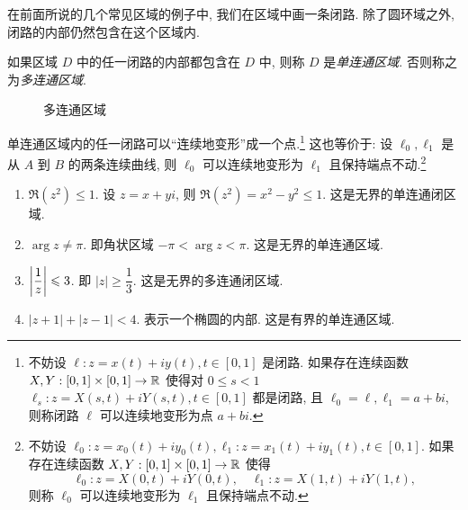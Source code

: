 在前面所说的几个常见区域的例子中, 我们在区域中画一条闭路.
除了圆环域之外, 闭路的内部仍然包含在这个区域内.

\begin{definition}[单连通区域和多连通区域]
  如果区域 $D$ 中的任一闭路的内部都包含在 $D$ 中, 则称 $D$ 是\emph{单连通区域}.
  否则称之为\emph{多连通区域}.
\end{definition}

\begin{figure}[hbpt]
  \centering
  \caption{多连通区域}
\end{figure}

单连通区域内的任一闭路可以``连续地变形''成一个点.\footnote{不妨设 $\ell: z=x(t)+iy(t),t\in[0,1]$ 是闭路.
如果存在连续函数 $X,Y:[0,1]\times[0,1]\to {\mathbb{R}}$ 使得对 $0\le s<1$
$\ell_s: z=X(s,t)+iY(s,t),t\in[0,1]$
都是闭路, 且 $\ell_0=\ell,\ell_1=a+bi$,
则称闭路 $\ell$ 可以连续地变形为点 $a+bi$.}
这也等价于: 设 $\ell_0,\ell_1$ 是从 $A$ 到 $B$ 的两条连续曲线, 则 $\ell_0$ 可以连续地变形为 $\ell_1$ 且保持端点不动.\footnote{不妨设 $\ell_0: z=x_0(t)+iy_0(t),\ell_1: z=x_1(t)+iy_1(t),t\in[0,1]$.
如果存在连续函数 $X,Y:[0,1]\times[0,1]\to {\mathbb{R}}$ 使得
\[\ell_0: z=X(0,t)+iY(0,t),\quad \ell_1: z=X(1,t)+iY(1,t),\]
则称 $\ell_0$ 可以连续地变形为 $\ell_1$ 且保持端点不动.
}

\begin{example}
  \begin{enumerate}
    \item $\Re(z^2)\le1$. 设 $z=x+yi$, 则 $\Re(z^2)=x^2-y^2\le1$. 这是无界的单连通闭区域.
    \item $\arg z\neq \pi$. 即角状区域 $-\pi<\arg z<\pi$. 这是无界的单连通区域.
    \item $\left|\dfrac1z\right|\leqslant3$. 即 $|z|\ge\dfrac13$. 这是无界的多连通闭区域.
    \item $|z+1|+|z-1|<4$. 表示一个椭圆的内部. 这是有界的单连通区域.
  \end{enumerate}
\end{example}

